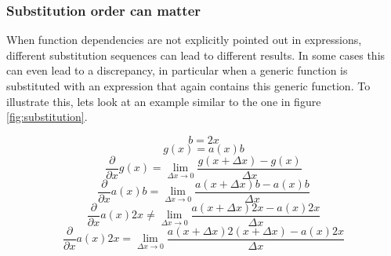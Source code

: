 \documentclass{article}
\begin{document}
\newpage

\subsubsection{Substitution order can matter}
\label{section:substitution-loophole}
When function dependencies are not explicitly pointed out in expressions, different substitution sequences can lead to different results. In some cases this can even lead to a discrepancy, in particular when a generic function is substituted with an expression that again contains this generic function. To illustrate this, lets look at an example similar to the one in figure \ref{fig:substitution}.

\begin{equation} b=2x
\end{equation}
\begin{equation} g(x)=a(x)b
\end{equation}
\begin{equation} \frac{\partial}{\partial x}g(x)=\lim_{\Delta x\to0}\frac{g(x+\Delta x)-g(x)}{\Delta x}
\end{equation}
\begin{equation} \frac{\partial}{\partial x}a(x)b=\lim_{\Delta x\to0}\frac{a(x+\Delta x)b-a(x)b}{\Delta x}
\end{equation}
\begin{equation} \frac{\partial}{\partial x}a(x)2x\neq\lim_{\Delta x\to0}\frac{a(x+\Delta x)2x-a(x)2x}{\Delta x}
\end{equation}
\begin{equation} \frac{\partial}{\partial x}a(x)2x=\lim_{\Delta x\to0}\frac{a(x+\Delta x)2(x+\Delta x)-a(x)2x}{\Delta x}
\end{equation}

\vspace{1em}
\end{document}
